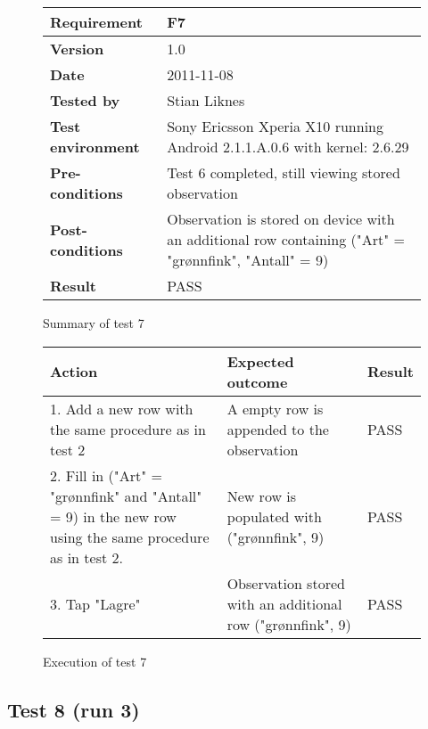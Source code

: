 	\begin{figure}[htb]
		\centering
		\begin{tabular}{|p{3.5cm}|p{7.0cm}|} \hline
			\textbf{Requirement} & F7 \\ \hline
			\textbf{Version} & 1.0 \\ \hline
			\textbf{Date} & 2011-11-08 \\ \hline
			\textbf{Tested by} & Stian Liknes \\ \hline
			\textbf{Test environment} & Sony Ericsson Xperia X10 running Android 2.1.1.A.0.6 with kernel: 2.6.29 \\ \hline
			\textbf{Pre-conditions} & Test 6 completed, still viewing stored observation \\ \hline
			\textbf{Post-conditions} & Observation is stored on device with an additional row containing ("Art" = "grønnfink", "Antall" = 9) \\ \hline
			\textbf{Result} & PASS \\ \hline
		\end{tabular}
		\caption{Summary of test 7}
	\end{figure}

	\begin{figure}[htb]
		\centering
		\begin{tabular}{|p{5.0cm}|p{5.0cm}|p{1cm}|}
			\hline \textbf{Action} & \textbf{Expected outcome} & \textbf{Result} \\ \hline

			1. Add a new row with the same procedure as in test 2 &
			A empty row is appended to the observation &
			PASS \\ \hline

			2. Fill in ("Art" = "grønnfink" and "Antall" = 9) in the new row
			using the same procedure as in test 2. &
			New row is populated with ("grønnfink", 9) &
			PASS \\ \hline

			3. Tap "Lagre" &
			Observation stored with an additional row ("grønnfink", 9) &
			PASS \\ \hline

		\end{tabular}
		\caption{Execution of test 7}
	\end{figure}

\newpage
\subsection{Test 8 (run 3)}


